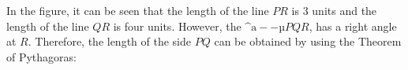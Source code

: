         \label{m39107*id66883}In the figure, it can be seen that the length of the line \begin{math}PR\end{math} is 3 units and the length of the line \begin{math}QR\end{math} is four units. However, the \begin{math}\mathrm{\^{a}--µ}PQR\end{math}, has a right angle at \begin{math}R\end{math}. Therefore, the length of the side \begin{math}PQ\end{math} can be obtained by using the Theorem of Pythagoras:\par 
        \label{m39107*id66950}\nopagebreak\noindent{}
    
